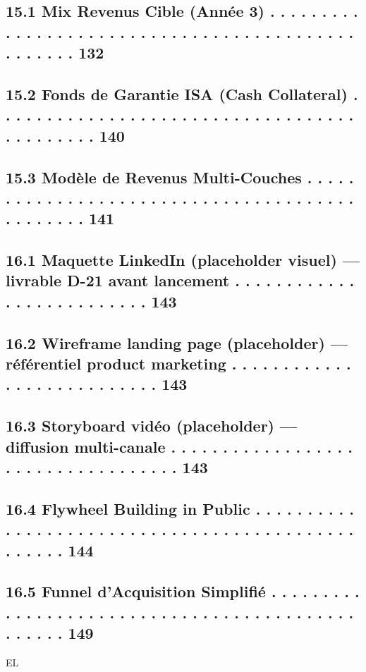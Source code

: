 \subsection{15.1 Mix Revenus Cible (Année 3) . . . . . . . . . . . . . . . . . . . . . . . . . . . . . . . . . . . . . . . . . . . . . . . . . . 132}
\subsection{15.2 Fonds de Garantie ISA (Cash Collateral) . . . . . . . . . . . . . . . . . . . . . . . . . . . . . . . . . . . . . . . . . . . . 140}
\subsection{15.3 Modèle de Revenus Multi-Couches . . . . . . . . . . . . . . . . . . . . . . . . . . . . . . . . . . . . . . . . . . . . . . . 141}
\vspace{0.5em}
\subsection{16.1 Maquette LinkedIn (placeholder visuel) — livrable D-21 avant lancement . . . . . . . . . . . . . . . . . . . . . . . . . . 143}
\subsection{16.2 Wireframe landing page (placeholder) — référentiel product marketing . . . . . . . . . . . . . . . . . . . . . . . . . . . 143}
\subsection{16.3 Storyboard vidéo (placeholder) — diffusion multi-canale . . . . . . . . . . . . . . . . . . . . . . . . . . . . . . . . . . . 143}
\subsection{16.4 Flywheel Building in Public . . . . . . . . . . . . . . . . . . . . . . . . . . . . . . . . . . . . . . . . . . . . . . . . . . 144}
\subsection{16.5 Funnel d’Acquisition Simplifié . . . . . . . . . . . . . . . . . . . . . . . . . . . . . . . . . . . . . . . . . . . . . . . . . 149}
\vspace{0.5em}
\vspace{0.5em}
\vspace{0.5em}
\vspace{0.5em}
EL\\
